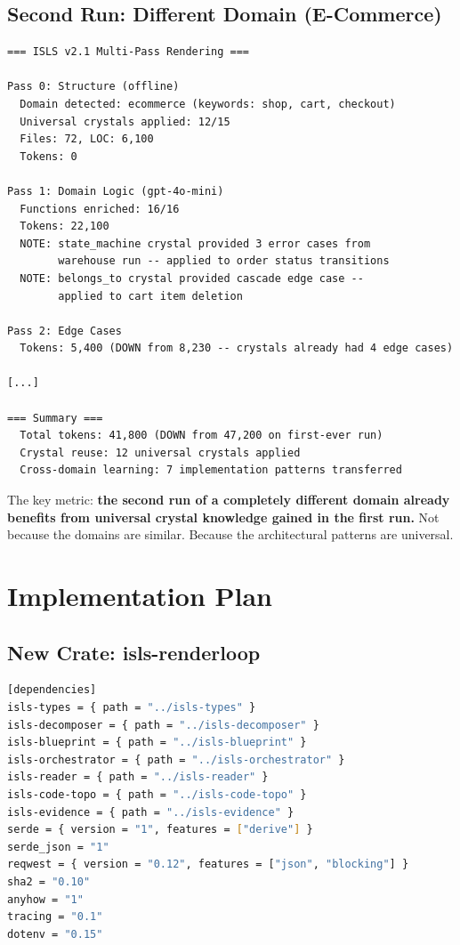 \documentclass[11pt,a4paper]{article}
\begin{document}
\subsection{Second Run: Different Domain (E-Commerce)}

\begin{lstlisting}[title=ecommerce.toml -- completely different domain]
=== ISLS v2.1 Multi-Pass Rendering ===

Pass 0: Structure (offline)
  Domain detected: ecommerce (keywords: shop, cart, checkout)
  Universal crystals applied: 12/15
  Files: 72, LOC: 6,100
  Tokens: 0

Pass 1: Domain Logic (gpt-4o-mini)
  Functions enriched: 16/16
  Tokens: 22,100
  NOTE: state_machine crystal provided 3 error cases from
        warehouse run -- applied to order status transitions
  NOTE: belongs_to crystal provided cascade edge case --
        applied to cart item deletion

Pass 2: Edge Cases
  Tokens: 5,400 (DOWN from 8,230 -- crystals already had 4 edge cases)

[...]

=== Summary ===
  Total tokens: 41,800 (DOWN from 47,200 on first-ever run)
  Crystal reuse: 12 universal crystals applied
  Cross-domain learning: 7 implementation patterns transferred
\end{lstlisting}

The key metric: \textbf{the second run of a completely different
domain already benefits from universal crystal knowledge gained in
the first run.} Not because the domains are similar. Because the
architectural patterns are universal.

\section{Implementation Plan}

\subsection{New Crate: isls-renderloop}

\begin{lstlisting}[language=bash]
[dependencies]
isls-types = { path = "../isls-types" }
isls-decomposer = { path = "../isls-decomposer" }
isls-blueprint = { path = "../isls-blueprint" }
isls-orchestrator = { path = "../isls-orchestrator" }
isls-reader = { path = "../isls-reader" }
isls-code-topo = { path = "../isls-code-topo" }
isls-evidence = { path = "../isls-evidence" }
serde = { version = "1", features = ["derive"] }
serde_json = "1"
reqwest = { version = "0.12", features = ["json", "blocking"] }
sha2 = "0.10"
anyhow = "1"
tracing = "0.1"
dotenv = "0.15"
\end{lstlisting}
\end{document}
